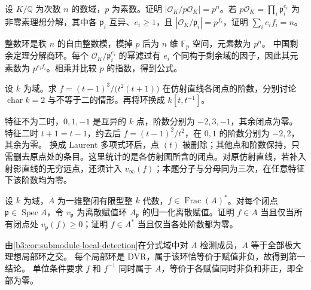 \begin{exercise}\label{b3:ex:10-number-prime-residue}
	设 \(K/\mathbb Q\) 为次数 \(n\) 的数域，\(p\) 为素数。证明 \(|\mathcal O_K/p\mathcal O_K|=p^n\)。若 \(p\mathcal O_K=\prod_i\mathfrak p_i^{e_i}\) 为非零素理想分解，其中各 \(\mathfrak p_i\) 互异、\(e_i\ge1\)，且 \(|\mathcal O_K/\mathfrak p_i|=p^{f_i}\)，证明 \(\sum_i e_if_i=n\)。
\end{exercise}
\begin{solution}
	整数环是秩 \(n\) 的自由整数模，模掉 \(p\) 后为 \(n\) 维 \(\mathbb F_p\) 空间，元素数为 \(p^n\)。 中国剩余定理分解商环。每个 \(\mathcal O_K/\mathfrak p_i^{e_i}\) 的幂滤过有 \(e_i\) 个同构于剩余域的因子，因此其元素数为 \(p^{e_if_i}\)。相乘并比较 \(p\) 的指数，得到公式。
\end{solution}

\begin{exercise}\label{b3:ex:10-affine-orders}
	设 \(k\) 为域。求 \(f=(t-1)^3/\bigl(t^2(t+1)\bigr)\) 在仿射直线各闭点的阶数，分别讨论 \(\operatorname{char}k=2\) 与不等于二的情形。再将环换成 \(k[t,t^{-1}]\)。
\end{exercise}
\begin{solution}
	特征不为二时，\(0,1,-1\) 是互异的 \(k\) 点，阶数分别为 \(-2,3,-1\)，其余闭点为零。 特征二时 \(t+1=t-1\)，约去后 \(f=(t-1)^2/t^2\)，在 \(0,1\) 的阶数分别为 \(-2,2\)，其余为零。 换成 Laurent 多项式环后，点 \((t)\) 被删除；其他点和阶数保持，只需删去原点处的条目。这里统计的是各仿射图所含的闭点。对原仿射直线，若补入射影直线的无穷远点，还须计入 \(v_\infty(f)\)；本题分子与分母同为三次，在任意特征下该阶数均为零。
\end{solution}

\begin{exercise}\label{b3:ex:10-normal-affine-membership}
	设 \(k\) 为域，\(A\) 为一维整闭有限型整 \(k\) 代数，\(f\in\operatorname{Frac}(A)^*\)。对每个闭点 \(\mathfrak p\in\operatorname{Spec}A\)，令 \(v_{\mathfrak p}\) 为离散赋值环 \(A_{\mathfrak p}\) 的归一化离散赋值。证明 \(f\in A\) 当且仅当所有闭点处 \(v_{\mathfrak p}(f)\ge0\)；证明 \(f\in A^*\) 当且仅当各处阶数都为零。
\end{exercise}
\begin{solution}
	由\cref{b3:cor:submodule-local-detection}在分式域中对 \(A\) 检测成员，\(A\) 等于全部极大理想局部环之交。 每个局部环是 DVR，属于该环恰等价于赋值非负，故得到第一结论。 单位条件要求 \(f\) 和 \(f^{-1}\) 同时属于 \(A\)，等价于各赋值同时非负和非正，即全部为零。
\end{solution}
